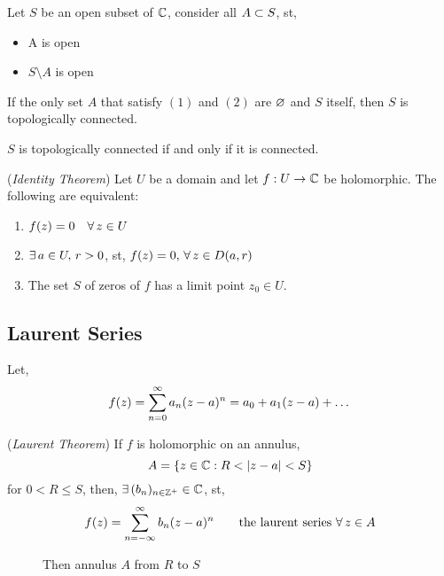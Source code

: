 \documentclass{article}
\begin{document}
Let $S$ be an open subset of $\mathbb{C}$, consider all $A\subset S$, st,
\begin{itemize}
  \item A is open
  \item $S\setminus A$ is open
\end{itemize}
If the only set $A$ that satisfy $(1)$ and $(2)$ are $\varnothing$ and $S$ itself, then $S$ is topologically connected.

\begin{nlemma}
  $S$ is topologically connected if and only if it is connected.
\end{nlemma}

\begin{nthm}{(\textit{Identity Theorem})}
  Let $U$ be a domain and let $f : U \to \mathbb{C}$ be holomorphic. The following are equivalent:
  \begin{enumerate}
    \item $f(z) = 0 \quad\forall\, z\in U$
    \item $\exists\, a\in U,\, r >0$, st, $f(z) = 0,\, \forall\, z\in D(a, r)$
    \item The set $S$ of zeros of $f$ has a limit point $z_0\in U$.
  \end{enumerate}
\end{nthm}

\subsection{Laurent Series}
Let,
$$ f(z) = \sum_{n=0}^\infty a_n(z - a)^n = a_0 + a_1(z-a) + \dots $$
\begin{nthm}{(\textit{Laurent Theorem})}
  If $f$ is holomorphic on an annulus,
  $$ A = \{z\in\mathbb{C} : R < |z - a| < S\} $$
  for $0 < R \le S$, then, $\exists\, (b_n)_{n\in\mathbb{Z}^+}\in \mathbb{C}$, st,
  $$ f(z) = \sum_{n = -\infty}^{\infty} b_n(z - a)^n \qquad \text{the laurent series $\forall\, z\in A$}$$
\end{nthm}

\begin{figure}[!ht]
  \centering
  \caption{ Then annulus $A$ from $R$ to $S$}
\end{figure}
\end{document}
